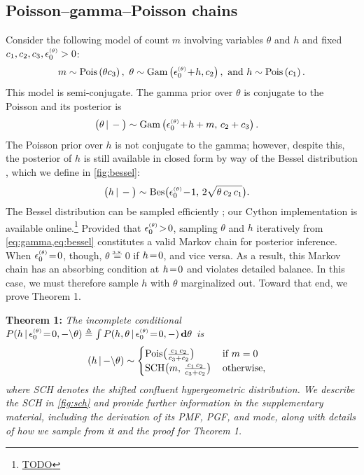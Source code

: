 \documentclass{article}
\begin{document}
\subsection{Poisson--gamma--Poisson chains}
\label{sec:recursion}
Consider the following model of count $m$ involving variables $\theta$ and $h$ and fixed $c_1, c_2, c_3, \epstheta >0$:
\begin{equation}
m \sim \Pois{\theta c_3},\,\,
%
\theta \sim \Gam{\epstheta \tp h, c_2},\,\,
%
\textrm{and}\,\, h \sim \Pois{c_1}.
\end{equation}
This model is semi-conjugate. The gamma prior over $\theta$ is conjugate to the Poisson and its posterior is
%
\begin{align}
\label{eq:gamma}
\compcond{\theta} &\sim \Gam{\epstheta \tp h + m,\, c_2 + c_3}.
\end{align}
The Poisson prior over $h$ is not conjugate to the gamma; however, despite this, the posterior of $h$ is still available in closed form by way of the Bessel distribution \cite{yuan2000bessel}, which we define in \cref{fig:bessel}:
\begin{align}
\label{eq:bessel}
\compcond{h} &\sim \textrm{Bes}\big(\epstheta \tm 1,\, 2\sqrt{\theta \,c_2\, c_1}\big).
\end{align}
The Bessel distribution can be sampled efficiently \cite{devroye2002simulating}; our Cython implementation is available online.\footnote{\url{TODO}}
Provided that $\epstheta \!>\! 0$, sampling $\theta$ and $h$ iteratively from \cref{eq:gamma,eq:bessel} constitutes a valid Markov chain for posterior inference. When $\epstheta \teq 0$, though, $\theta \stackrel{\textrm{a.s.}}{=} 0$ if $h \!=\! 0$, and vice versa. As a result, this Markov chain has an absorbing condition at $h \!=\! 0$ and violates detailed balance. In this case, we must therefore sample $h$ with $\theta$ marginalized out. Toward that end, we prove Theorem 1.~

\textbf{Theorem 1:} \textit{The incomplete conditional $P(h\given{\epstheta \teq 0, -\backslash} \theta)\triangleq \int P(h,\theta\given \epstheta \teq 0, -)\,\mathbf{d}\theta$ is}~
\begin{align}
\label{eq:sch}
\left(h \,|\, {-\backslash} \theta\right) &\sim
\begin{cases}
\textrm{Pois}\big(\frac{c_1\,c_2}{c_3+c_2}\big) &\textrm{if }m=0\\
\textrm{SCH}\big(m,\, \frac{c_1\,c_2}{c_3+c_2}\big)\, &\textrm{otherwise,}
\end{cases}
\end{align}
\textit{where SCH denotes the shifted confluent hypergeometric distribution. We describe the SCH in \cref{fig:sch} and provide further information in the supplementary material, including the derivation of its PMF, PGF, and mode, along with details of how we sample from it and the proof for Theorem 1.}~
\end{document}
